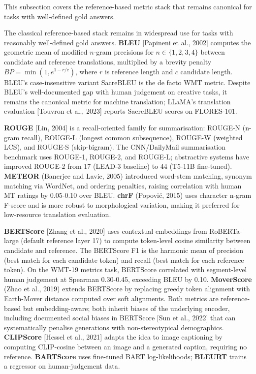 This subsection covers the reference-based metric stack that remains canonical for tasks with well-defined gold answers.

The classical reference-based stack remains in widespread use for tasks with reasonably well-defined gold answers. \textbf{BLEU} {[}Papineni et al., 2002{]} computes the geometric mean of modified \(n\)-gram precisions for \(n \in \{1, 2, 3, 4\}\) between candidate and reference translations, multiplied by a brevity penalty \(BP = \min(1, e^{1-r/c})\), where \(r\) is reference length and \(c\) candidate length. BLEU's case-insensitive variant SacreBLEU is the de facto WMT metric. Despite BLEU's well-documented gap with human judgement on creative tasks, it remains the canonical metric for machine translation; LLaMA's translation evaluation {[}Touvron et al., 2023{]} reports SacreBLEU scores on FLORES-101.

\textbf{ROUGE} {[}Lin, 2004{]} is a recall-oriented family for summarisation: ROUGE-N (n-gram recall), ROUGE-L (longest common subsequence), ROUGE-W (weighted LCS), and ROUGE-S (skip-bigram). The CNN/DailyMail summarisation benchmark uses ROUGE-1, ROUGE-2, and ROUGE-L; abstractive systems have improved ROUGE-2 from 17 (LEAD-3 baseline) to 44 (T5-11B fine-tuned). \textbf{METEOR} (Banerjee and Lavie, 2005) introduced word-stem matching, synonym matching via WordNet, and ordering penalties, raising correlation with human MT ratings by 0.05-0.10 over BLEU. \textbf{chrF} (Popović, 2015) uses character n-gram F-score and is more robust to morphological variation, making it preferred for low-resource translation evaluation.

\textbf{BERTScore} {[}Zhang et al., 2020{]} uses contextual embeddings from RoBERTa-large (default reference layer 17) to compute token-level cosine similarity between candidate and reference. The BERTScore F1 is the harmonic mean of precision (best match for each candidate token) and recall (best match for each reference token). On the WMT-19 metrics task, BERTScore correlated with segment-level human judgement at Spearman 0.30-0.45, exceeding BLEU by 0.10. \textbf{MoverScore} (Zhao et al., 2019) extends BERTScore by replacing greedy token alignment with Earth-Mover distance computed over soft alignments. Both metrics are reference-based but embedding-aware; both inherit biases of the underlying encoder, including documented social biases in BERTScore {[}Sun et al., 2022{]} that can systematically penalise generations with non-stereotypical demographics. \textbf{CLIPScore} {[}Hessel et al., 2021{]} adapts the idea to image captioning by computing CLIP-cosine between an image and a generated caption, requiring no reference. \textbf{BARTScore} uses fine-tuned BART log-likelihoods; \textbf{BLEURT} trains a regressor on human-judgement data.

